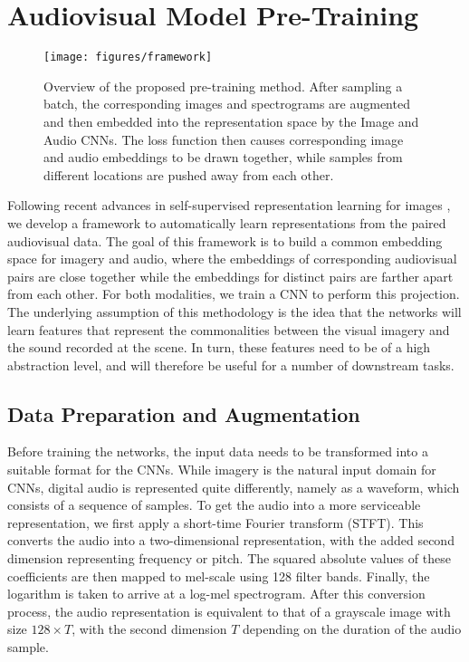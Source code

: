 \documentclass[journal]{IEEEtran}
\begin{document}
\section{Audiovisual Model Pre-Training}\label{sect:methodology}
\begin{figure}
    \centering
    \texttt{[image: figures/framework]}
    \caption{Overview of the proposed pre-training method. After sampling a batch,
        the corresponding images and spectrograms are augmented and then embedded into the
        representation space by the Image and Audio CNNs.
        The loss function then causes corresponding
        image and audio embeddings to be drawn together,
        while samples from different locations are pushed away from each other.
    }
    \label{fig:framework}
\end{figure}
Following recent advances in self-supervised representation learning
for images \cite{simclr,he_momentum_2020},
we develop a framework to automatically learn representations from the paired audiovisual data.
The goal of this framework is to build a common embedding space for imagery and audio,
where the embeddings of corresponding audiovisual pairs are close together while
the embeddings for distinct pairs are farther apart from each other.
For both modalities, we train a CNN to perform this projection.
The underlying assumption of this methodology is the idea that the networks will learn features that
represent the commonalities between the visual imagery and the sound recorded at the scene.
In turn, these features need to be of a high abstraction level,
and will therefore be useful for a number of downstream tasks.

\subsection{Data Preparation and Augmentation}
Before training the networks,
the input data needs to be transformed into a suitable format for the CNNs.
While imagery is the natural input domain for CNNs,
digital audio is represented quite differently,
namely as a waveform, which consists of a sequence of samples.
To get the audio into a more serviceable representation,
we first apply a short-time Fourier transform (STFT).
This converts the audio into a two-dimensional representation,
with the added second dimension representing frequency or pitch.
The squared absolute values of these coefficients are then mapped to mel-scale using 128 filter bands.
Finally, the logarithm is taken to arrive at a log-mel spectrogram.
After this conversion process, the audio representation is equivalent to that of a grayscale
image with size $128 \times T$,
with the second dimension $T$ depending on the duration of the audio sample.
\end{document}
